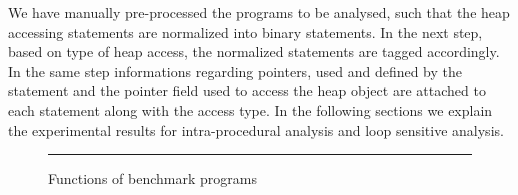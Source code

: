 We have manually pre-processed the programs to be analysed, such that 
the heap accessing statements are normalized into binary statements. 
In the next step, based on type of heap access, the normalized 
statements are tagged accordingly. In the same step informations 
regarding pointers,  used and defined by the statement and the 
pointer field used to access the heap object are attached to 
each statement along with the access type. In the following sections 
we explain the experimental results for intra-procedural analysis 
and loop sensitive analysis.
\begin{figure}
  \begin{center}
  \end{center}
  \hrule
  \caption{\label{fig:bench} Functions of benchmark programs}
\end{figure}
\begin{comment}
\begin{figure}
  \begin{center}
  \end{center}
  \caption{\label{fig:bisort} Function \emph{bisort}}
\end{figure}
\end{comment}
